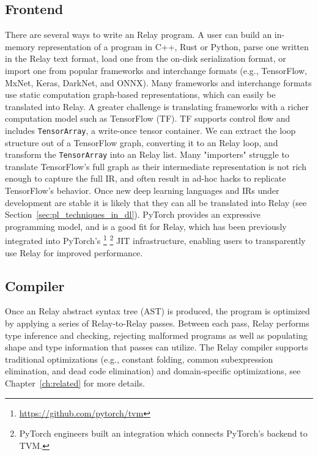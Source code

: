 \subsection{Frontend}

There are several ways to write an Relay program.
A user can build an in-memory representation of
    a program in C++, Rust or Python,
    parse one written in the Relay text format,
    load one from the on-disk serialization format,
    or import one from popular frameworks and interchange formats
    (e.g., TensorFlow, MxNet, Keras, DarkNet, and ONNX).
Many frameworks and interchange formats use static computation graph-based representations,
    which can easily be translated into Relay.
A greater challenge is translating frameworks
    with a richer computation model such as TensorFlow (TF).
TF supports control flow and includes \verb|TensorArray|, a write-once
    tensor container.
We can extract the loop structure out of a TensorFlow graph, converting
    it to an Relay loop, and transform the \verb|TensorArray| into an Relay list.
Many "importers" struggle to translate TensorFlow's full graph as their intermediate representation
  is not rich enough to capture the full IR, and often result in ad-hoc hacks to replicate
  TensorFlow's behavior.
Once new deep learning languages and IRs under development
    are stable it is likely that they can all be translated into Relay (see
    Section~\ref{sec:pl_techniques_in_dl}).
PyTorch provides an expressive programming model, and is a good fit
    for Relay, which has been previously integrated into PyTorch's
    \footnote{\url{https://github.com/pytorch/tvm}}
    \footnote{PyTorch engineers built an integration which connects PyTorch's backend to TVM.}
    JIT infrastructure, enabling users to transparently use Relay for improved performance.

\subsection{Compiler}
Once an Relay abstract syntax tree (AST) is produced,
    the program is optimized by applying a series of Relay-to-Relay
    passes.
Between each pass, Relay performs type inference and checking,
    rejecting malformed programs as well as populating shape and type
    information that passes can utilize.
The Relay compiler supports traditional optimizations
    (e.g., constant folding, common subexpression elimination, and dead code elimination)
    and domain-specific optimizations, see Chapter~\ref{ch:related} for more details.

